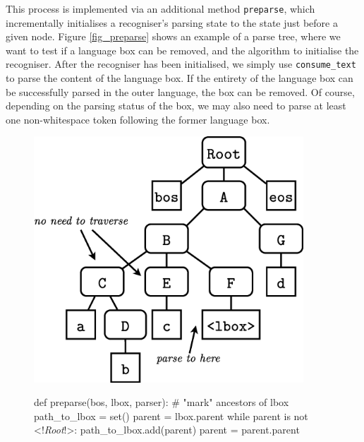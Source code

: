 \documentclass[sigplan,screen]{acmart}\settopmatter{printfolios=true,printccs=false,printacmref=false}
\begin{document}
This process is implemented via an additional method \texttt{preparse}, which
incrementally initialises a recogniser's parsing state to the state just before
a given node. Figure \ref{fig_preparse} shows an example of a parse tree, where
we want to test if a language box can be removed, and the algorithm to
initialise the recogniser.
After the recogniser has been initialised, we simply use \texttt{consume\_text}
to parse the content of the language box. If the entirety of the language box
can be successfully parsed in the outer language, the box can be removed.  Of
course, depending on the parsing status of the box, we may also need to parse
at least one non-whitespace token following the former language box.

\begin{figure}
\begin{minipage}{0.45\textwidth}
\includegraphics[width=0.9\textwidth]{images/autoremoval}
\end{minipage}
\begin{minipage}{0.5\textwidth}
\begin{lstdefault}[basicstyle=\linespread{1.0}\footnotesize\ttfamily]
def preparse(bos, lbox, parser):
  # "mark" ancestors of lbox
  path_to_lbox = set()
  parent = lbox.parent
  while parent is not <!\textit{Root}!>:
    path_to_lbox.add(parent)
    parent = parent.parent


\end{lstdefault}
\end{minipage}
\end{figure}
\end{document}
